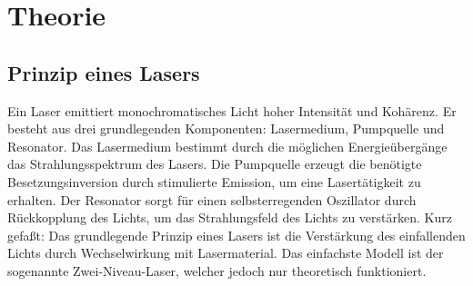 \section{Theorie}
\subsection{Prinzip eines Lasers}
Ein Laser emittiert monochromatisches Licht hoher Intensität und
Kohärenz.  Er besteht aus drei grundlegenden Komponenten: Lasermedium,
Pumpquelle und Resonator.  Das Lasermedium bestimmt durch die möglichen
Energieübergänge das Strahlungsspektrum des Lasers.  Die Pumpquelle
erzeugt die benötigte Besetzungsinversion durch stimulierte
Emission, um eine Lasertätigkeit zu erhalten.  Der Resonator sorgt für
einen selbsterregenden Oszillator durch Rückkopplung des Lichts, um das
Strahlungsfeld des Lichts zu verstärken.  Kurz gefaßt: Das grundlegende
Prinzip eines Lasers ist die Verstärkung des einfallenden Lichts durch
Wechselwirkung mit Lasermaterial.  Das einfachste Modell ist der
sogenannte Zwei-Niveau-Laser, welcher jedoch nur theoretisch 
funktioniert.

